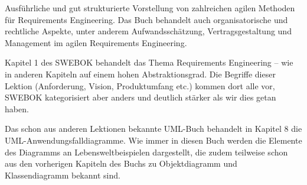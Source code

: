 {Ausführliche und gut strukturierte Vorstellung von zahlreichen agilen Methoden für Requirements Engineering. Das Buch behandelt auch organisatorische und rechtliche Aspekte, unter anderem Aufwandsschätzung, Vertragsgestaltung und Management im agilen Requirements Engineering.}

{Kapitel 1 des SWEBOK behandelt das Thema Requirements Engineering -- wie in anderen Kapiteln auf einem hohen Abstraktionsgrad. Die Begriffe dieser Lektion (Anforderung, Vision, Produktumfang etc.) kommen dort alle vor, SWEBOK kategorisiert aber anders und deutlich stärker als wir dies getan haben.}

{Das schon aus anderen Lektionen bekannte UML-Buch behandelt in Kapitel 8 die UML-Anwendungsfalldiagramme. Wie immer in diesen Buch werden die Elemente des Diagramms an Lebensweltbeispielen dargestellt, die zudem teilweise schon aus den vorherigen Kapiteln des Buchs zu Objektdiagramm und Klassendiagramm bekannt sind.}